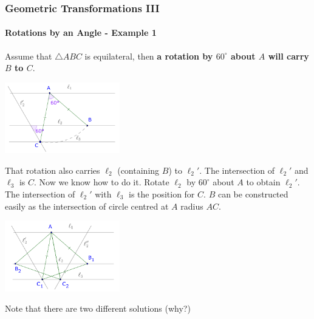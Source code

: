 \documentclass[8pt,xcolor=table,dvipsnames]{beamer}
\newcommand{\dg}{^\circ}
\begin{document}
\begin{frame}[t]
    \frametitle{Geometric Transformations III}
    \framesubtitle{Rotations by an Angle - Example 1}
    \begin{overprint}
        Assume that $\triangle ABC$ is equilateral, then \textbf{a rotation by $60\dg$ about $A$ will carry $B$ to $C$}.
        \begin{center}
            \includegraphics[width=5cm]{./svg/pdf/rotation-4b.pdf}
        \end{center}
        That rotation also carries $\ell_2$  (containing $B$) to $\ell_2'$. The intersection of $\ell_2'$ and $\ell_3$ is $C.$
        Now we know how to do it. Rotate $\ell_2$ by $60\dg$ about $A$ to obtain $\ell_2'$.
        The intersection of $\ell_2'$ with $\ell_3$ is the position for $C.$
        $B$ can be constructed easily as the intersection of circle centred at $A$ radius $AC.$
        \begin{center}
            \includegraphics[width=5cm]{./svg/pdf/rotation-4c.pdf}
        \end{center}
    
        \bigbreak
        Note that there are two different solutions (why?)
    \end{overprint}
\end{frame}
\end{document}
